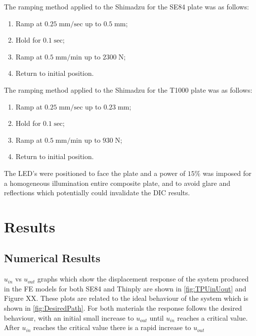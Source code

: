 \documentclass{IEEEtran}
\begin{document}
        The ramping method applied to the Shimadzu for the SE84 plate was as follows:
            \begin{enumerate}
                \item Ramp at $0.25\;\text{mm/sec}$ up to $0.5\;\text{mm}$;
                \item Hold for $0.1\;\text{sec}$;
                \item Ramp at $0.5\;\text{mm/min}$ up to $2300\;\text{N}$;
                \item Return to initial position.
            \end{enumerate}
    
        The ramping method applied to the Shimadzu for the T1000 plate was as follows:
            \begin{enumerate}
                \item Ramp at $0.25\;\text{mm/sec}$ up to $0.23\;\text{mm}$;
                \item Hold for $0.1\;\text{sec}$;
                \item Ramp at $0.5\;\text{mm/min}$ up to $930\;\text{N}$;
                \item Return to initial position.
            \end{enumerate}
    
        The LED's were positioned to face the plate and a power of $15\%$ was imposed for a homogeneous illumination entire composite plate, and to avoid glare and reflections which potentially could invalidate the DIC results. %
	
    \section{Results}
    
        \subsection{Numerical Results}
        $u_{in}$ vs $u_{out}$ graphs which show the displacement response of the system produced in the FE models for both SE84 and Thinply are shown in \cref{fig:TPUinUout} and Figure XX. These plots are related to the ideal behaviour of the system which is shown in \cref{fig:DesiredPath}. For both materials the response follows the desired behaviour, with an initial small increase to $u_{out}$ until $u_{in}$ reaches a critical value. After $u_{in}$ reaches the critical value there is a rapid increase to $u_{out}$
               
\end{document}

